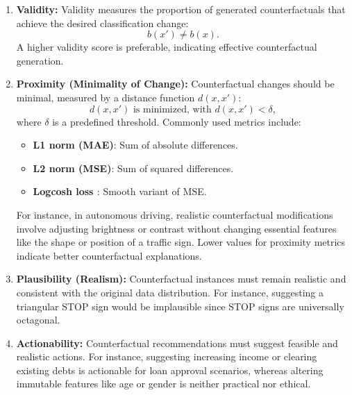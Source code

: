 \begin{enumerate}
    \item \textbf{Validity:}  
    Validity measures the proportion of generated counterfactuals that achieve the desired classification change:
    \begin{equation}
        b(x') \neq b(x).
    \end{equation}
    A higher validity score is preferable, indicating effective counterfactual generation.

    \item \textbf{Proximity (Minimality of Change):}  
    Counterfactual changes should be minimal, measured by a distance function \( d(x, x') \):
    \begin{equation}
        d(x, x') \text{ is minimized, with } d(x,x') < \delta,
    \end{equation}
    where \( \delta \) is a predefined threshold. Commonly used metrics include:
    \begin{itemize}
        \item \textbf{L1 norm (MAE)}: Sum of absolute differences.
        \item \textbf{L2 norm (MSE)}: Sum of squared differences.
        \item \textbf{Logcosh loss \cite{chen2019log}}: Smooth variant of MSE.
    \end{itemize}

    For instance, in autonomous driving, realistic counterfactual modifications involve adjusting brightness or contrast without changing essential features like the shape or position of a traffic sign. Lower values for proximity metrics indicate better counterfactual explanations.

    \item \textbf{Plausibility (Realism):}  
    Counterfactual instances must remain realistic and consistent with the original data distribution. For instance, suggesting a triangular STOP sign would be implausible since STOP signs are universally octagonal.

    \item \textbf{Actionability:}  
    Counterfactual recommendations must suggest feasible and realistic actions. For instance, suggesting increasing income or clearing existing debts is actionable for loan approval scenarios, whereas altering immutable features like age or gender is neither practical nor ethical.
\end{enumerate}



